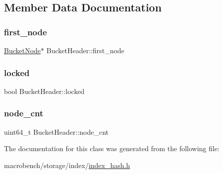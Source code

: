 \subsection{Member Data Documentation}
\mbox{\label{classBucketHeader_a4ec7aac89e39ec77488c7b1e8be33c56}} 
\subsubsection{\texorpdfstring{first\+\_\+node}{first\_node}}
{\footnotesize\ttfamily \hyperlink{classBucketNode}{Bucket\+Node}$\ast$ Bucket\+Header\+::first\+\_\+node}

\mbox{\label{classBucketHeader_aef842697ec95a54f0b5b798b88267e53}} 
\subsubsection{\texorpdfstring{locked}{locked}}
{\footnotesize\ttfamily bool Bucket\+Header\+::locked}

\mbox{\label{classBucketHeader_aa725cf07022db861aa15b07fec3ab123}} 
\subsubsection{\texorpdfstring{node\+\_\+cnt}{node\_cnt}}
{\footnotesize\ttfamily uint64\+\_\+t Bucket\+Header\+::node\+\_\+cnt}



The documentation for this class was generated from the following file\+:\begin{DoxyCompactItemize}
\item 
macrobench/storage/index/\hyperlink{index__hash_8h}{index\+\_\+hash.\+h}\end{DoxyCompactItemize}
